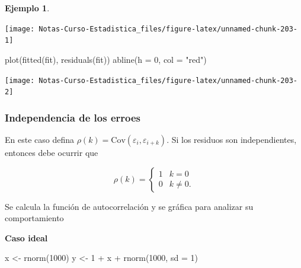 \documentclass[
  12pt,
]{book}
\newenvironment{Shaded}{\begin{snugshade}}{\end{snugshade}}
\newcommand{\AttributeTok}[1]{\textcolor[rgb]{0.77,0.63,0.00}{#1}}
\newcommand{\DecValTok}[1]{\textcolor[rgb]{0.00,0.00,0.81}{#1}}
\newcommand{\FunctionTok}[1]{\textcolor[rgb]{0.00,0.00,0.00}{#1}}
\newcommand{\NormalTok}[1]{#1}
\newcommand{\OtherTok}[1]{\textcolor[rgb]{0.56,0.35,0.01}{#1}}
\newcommand{\SpecialCharTok}[1]{\textcolor[rgb]{0.00,0.00,0.00}{#1}}
\newcommand{\StringTok}[1]{\textcolor[rgb]{0.31,0.60,0.02}{#1}}
\theoremstyle{definition}
\theoremstyle{definition}
\newtheorem{example}{Ejemplo}[chapter]
\theoremstyle{definition}
\theoremstyle{remark}
\begin{document}
\begin{example}
\begin{center}\texttt{[image: Notas-Curso-Estadistica\_files/figure-latex/unnamed-chunk-203-1]} \end{center}

\begin{Shaded}
\begin{Highlighting}[]
\FunctionTok{plot}\NormalTok{(}\FunctionTok{fitted}\NormalTok{(fit), }\FunctionTok{residuals}\NormalTok{(fit))}
\FunctionTok{abline}\NormalTok{(}\AttributeTok{h =} \DecValTok{0}\NormalTok{, }\AttributeTok{col =} \StringTok{"red"}\NormalTok{)}
\end{Highlighting}
\end{Shaded}

\begin{center}\texttt{[image: Notas-Curso-Estadistica\_files/figure-latex/unnamed-chunk-203-2]} \end{center}

\end{example}

\hypertarget{independencia-de-los-erroes}{%
\subsubsection{Independencia de los erroes}\label{independencia-de-los-erroes}}

En este caso defina \(\rho(k) = \text{Cov}(\varepsilon_i,\varepsilon_{i+k} )\). Si los residuos son independientes, entonces debe ocurrir que

\begin{equation*}
\rho(k) = \begin{cases}
1 & k=0\\
0 & k\neq 0.
\end{cases}  
\end{equation*}

Se calcula la función de autocorrelación y se gráfica para analizar su comportamiento

\textbf{Caso ideal}

\begin{Shaded}
\begin{Highlighting}[]
\NormalTok{x }\OtherTok{\textless{}{-}} \FunctionTok{rnorm}\NormalTok{(}\DecValTok{1000}\NormalTok{)}
\NormalTok{y }\OtherTok{\textless{}{-}} \DecValTok{1} \SpecialCharTok{+}\NormalTok{ x }\SpecialCharTok{+} \FunctionTok{rnorm}\NormalTok{(}\DecValTok{1000}\NormalTok{, }\AttributeTok{sd =} \DecValTok{1}\NormalTok{)}
\end{Highlighting}
\end{Shaded}
\end{document}
